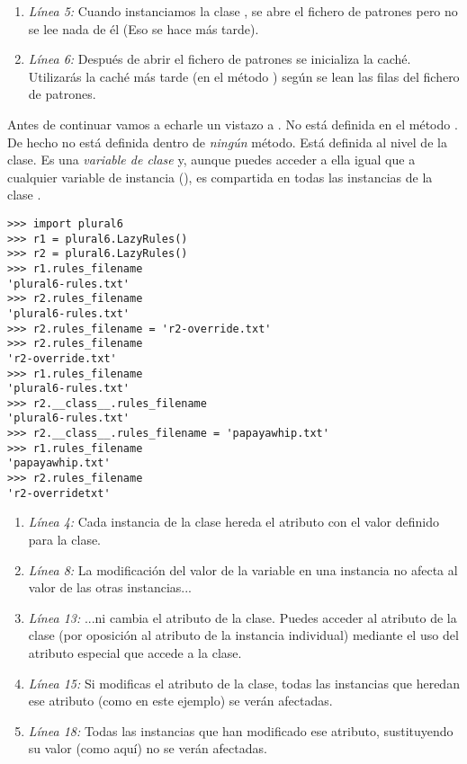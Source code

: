 \begin{enumerate}

\item \emph{Línea 5:} Cuando instanciamos la clase , se abre el fichero de patrones pero no se lee nada de él (Eso se hace más tarde).

\item \emph{Línea 6:} Después de abrir el fichero de patrones se inicializa la caché. Utilizarás la caché más tarde (en el método ) según se lean las filas del fichero de patrones.

\end{enumerate}

Antes de continuar vamos a echarle un vistazo a . No está definida en el método . De hecho no está definida dentro de \emph{ningún} método. Está definida al nivel de la clase. Es una \emph{variable de clase} y, aunque puedes acceder a ella igual que a cualquier variable de instancia (), es compartida en todas las instancias de la clase .

\noindent\begin{minipage}{\textwidth}
\begin{lstlisting}[mathescape=True]
>>> import plural6 
>>> r1 = plural6.LazyRules() 
>>> r2 = plural6.LazyRules() 
>>> r1.rules_filename
'plural6-rules.txt'
>>> r2.rules_filename 
'plural6-rules.txt' 
>>> r2.rules_filename = 'r2-override.txt'
>>> r2.rules_filename 
'r2-override.txt'
>>> r1.rules_filename 
'plural6-rules.txt' 
>>> r2.__class__.rules_filename
'plural6-rules.txt'
>>> r2.__class__.rules_filename = 'papayawhip.txt'
>>> r1.rules_filename 
'papayawhip.txt' 
>>> r2.rules_filename
'r2-overridetxt'
\end{lstlisting}
\end{minipage}

\begin{enumerate}

\item \emph{Línea 4:} Cada instancia de la clase hereda el atributo  con el valor definido para la clase.

\item \emph{Línea 8:} La modificación del valor de la variable en una instancia no afecta al valor de las otras instancias...

\item \emph{Línea 13:} ...ni cambia el atributo de la clase. Puedes acceder al atributo de la clase (por oposición al atributo de la instancia individual) mediante el uso del atributo especial  que accede a la clase.

\item \emph{Línea 15:} Si modificas el atributo de la clase, todas las instancias que heredan ese atributo (como  en este ejemplo) se verán afectadas.

\item \emph{Línea 18:} Todas las instancias que han modificado ese atributo, sustituyendo su valor (como  aquí) no se verán afectadas.

\end{enumerate}

